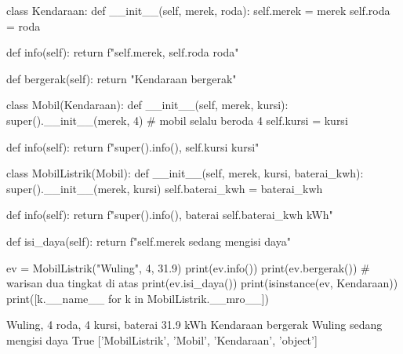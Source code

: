 \begin{kode}
class Kendaraan:
    def __init__(self, merek, roda):
        self.merek = merek
        self.roda = roda

    def info(self):
        return f"{self.merek}, {self.roda} roda"

    def bergerak(self):
        return "Kendaraan bergerak"

class Mobil(Kendaraan):
    def __init__(self, merek, kursi):
        super().__init__(merek, 4)          # mobil selalu beroda 4
        self.kursi = kursi

    def info(self):
        return f"{super().info()}, {self.kursi} kursi"

class MobilListrik(Mobil):
    def __init__(self, merek, kursi, baterai_kwh):
        super().__init__(merek, kursi)
        self.baterai_kwh = baterai_kwh

    def info(self):
        return f"{super().info()}, baterai {self.baterai_kwh} kWh"

    def isi_daya(self):
        return f"{self.merek} sedang mengisi daya"

ev = MobilListrik("Wuling", 4, 31.9)
print(ev.info())
print(ev.bergerak())                     # warisan dua tingkat di atas
print(ev.isi_daya())
print(isinstance(ev, Kendaraan))
print([k.__name__ for k in MobilListrik.__mro__])
\end{kode}

\begin{keluaran}
Wuling, 4 roda, 4 kursi, baterai 31.9 kWh
Kendaraan bergerak
Wuling sedang mengisi daya
True
['MobilListrik', 'Mobil', 'Kendaraan', 'object']
\end{keluaran}

